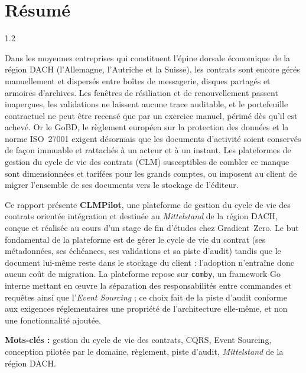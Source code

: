\chapter*{Résumé}
\begin{spacing}{1.2}

Dans les moyennes entreprises qui constituent l'épine dorsale économique de 
la région DACH (l'Allemagne, l'Autriche
et la Suisse), les contrats sont encore gérés manuellement et
dispersés entre boîtes de messagerie, disques partagés et armoires
d'archives. Les fenêtres de résiliation et de renouvellement passent
inaperçues, les validations ne laissent aucune trace auditable, et le
portefeuille contractuel ne peut être recensé que par un exercice manuel,
périmé dès qu'il est achevé. Or le GoBD, le règlement européen sur la
protection des données et la norme ISO~27001 exigent désormais que les
documents d'activité soient conservés de façon immuable et rattachés à un
acteur et à un instant. Les plateformes de gestion du cycle de vie des
contrats (CLM) susceptibles de combler ce manque sont dimensionnées et
tarifées pour les grands comptes, ou imposent au client de migrer l'ensemble
de ses documents vers le stockage de l'éditeur.

Ce rapport présente \textbf{CLMPilot}, une plateforme de gestion du cycle de
vie des contrats orientée intégration et destinée au \textit{Mittelstand} de
la région DACH, conçue et réalisée au cours d'un stage de fin d'études chez
Gradient~Zero. Le but fondamental de la plateforme est de gérer le cycle de vie du contrat
(ses métadonnées, ses échéances, ses validations et sa piste d'audit) tandis
que le document lui-même reste dans le stockage du client : l'adoption
n'entraîne donc aucun coût de migration. La plateforme repose sur
\texttt{comby}, un framework Go interne mettant en {\oe}uvre la séparation
des responsabilités entre commandes et requêtes ainsi que l'\textit{Event
Sourcing} ; ce choix fait de la piste d'audit conforme aux exigences
réglementaires une propriété de l'architecture elle-même, et non une
fonctionnalité ajoutée.


\vspace{0.5cm}

\noindent\textbf{Mots-clés :} gestion du cycle de vie des contrats, CQRS,
Event Sourcing, conception pilotée par le domaine, règlement, piste
d'audit, \textit{Mittelstand} de la région DACH.

\end{spacing}

